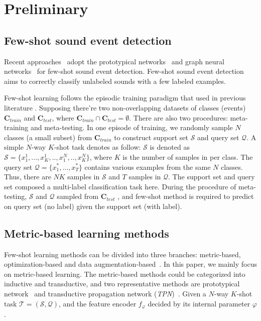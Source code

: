 \documentclass[a4paper]{article}
\begin{document}
\section{Preliminary}

\subsection{Few-shot sound event detection}
\vspace{-1.5mm}
Recent approaches~\cite{audiofew,attentionSimilarity,few-att-gnn} adopt the prototypical networks~\cite{protoNet} and graph neural networks~\cite{fewgnn} for few-shot sound event detection. Few-shot sound event detection aims to correctly classify unlabeled sounds with a few labeled examples.

Few-shot learning follows the episodic training paradigm that used in previous literature \cite{protoNet,maml}. Supposing there're two non-overlapping
datasets of classes (events) $\bm{C}_{train}$ and $\bm{C}_{test}$, where $\bm{C}_{train} \cap \bm{C}_{test} = \emptyset$. There are also two procedures: meta-training and meta-testing. In one episode of training, we randomly sample $N$ classes (a small subset) from $\bm{C}_{train}$ to construct support set $\mathcal{S}$ and query set $\mathcal{Q}$. A simple $N$-way $K$-shot task denotes as follow: $\mathcal{S}$ is denoted as $\mathcal{S} = \{x_1^1,...,x_K^1,..,x^N_1,..,x^N_K\}$, where $K$ is the number of samples in per class. The query set $\mathcal{Q} = \{ x_1^*,...,x_T^*\}$ contains various examples from the same $N$ classes. Thus, there are $NK$ samples in $\mathcal{S}$ and $T$ samples in $\mathcal{Q}$.  The support set and query set composed a multi-label classification task here. During the procedure of meta-testing, $\mathcal{S}$ and $\mathcal{Q}$ sampled from $\bm{C}_{test}$ , and few-shot method is required to predict on query set (no label) given the support set (with label).

\vspace{-2mm}
\subsection{Metric-based learning methods}
\label{methods}
\vspace{-1.5mm}
Few-shot learning methods can be divided into three branches: metric-based, optimization-based and data augmentation-based~\cite{opt1,opt2,koch2015siamese}. In this paper, we mainly focus on metric-based learning. The metric-based methods could be categorized into inductive and transductive, and two representative methods are prototypical network~\cite{protoNet} and transductive propagation network (\textit{TPN})~\cite{TPN}.
Given a $N$-way $K$-shot task $\mathcal{T} = (\mathcal{S}, \mathcal{Q})$, and the feature encoder $f_\varphi$ decided by its internal parameter $\varphi$.
\end{document}

